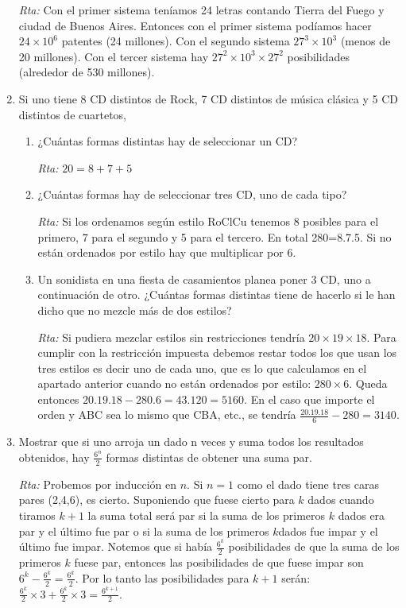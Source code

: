\documentclass[a4paper,12pt,twoside,spanish,reqno]{amsbook}
\numberwithin{equation}{section}
\begin{document}
\begin{enumerate}
\noindent\textit{Rta:} Con el primer sistema teníamos 24 letras contando Tierra del Fuego y ciudad de Buenos Aires. Entonces con el primer sistema podíamos hacer $24\times 10^6$ patentes (24 millones). Con el segundo sistema  $27^3\times 10^3$ (menos de 20 millones). Con el tercer sistema hay $27^2\times 10^3 \times 27^2$ posibilidades (alrededor de 530 millones).

\medskip

\item Si uno tiene 8 CD distintos de Rock, 7 CD distintos de música clásica y 5 CD
distintos de cuartetos,

\begin{enumerate}
\item 
¿Cuántas formas distintas hay de seleccionar un CD?

\noindent\textit{Rta:}  $20= 8+7+5$

\item ¿Cuántas formas hay de seleccionar tres CD, uno de cada tipo?

\noindent\textit{Rta:} Si los ordenamos según estilo RoClCu tenemos 8 posibles para el primero, 7 para el segundo y 5 para el tercero. En total 280=8.7.5. Si no están ordenados por estilo hay que multiplicar por 6.

\item Un sonidista en una fiesta de casamientos planea poner 3 CD, uno a continuación
de otro. ¿Cuántas formas distintas tiene de hacerlo si le han dicho que no
mezcle más de dos estilos?

\noindent\textit{Rta:} Si pudiera mezclar estilos  sin restricciones tendría  $20\times 19\times 18$. Para cumplir con la restricción impuesta debemos restar todos los que usan los tres estilos es decir uno de cada uno, que es lo que calculamos en el  apartado anterior cuando no están ordenados por estilo: $280\times 6$. Queda entonces $20.19.18-280.6=43.120=5160$. En el caso que importe el orden y ABC sea lo mismo que CBA, etc., se tendría $\frac{20.19.18}{6}-280=3140$.
\end{enumerate}

\medskip

\item Mostrar que si uno arroja un dado n veces y suma todos los resultados obtenidos,
hay $\frac{6^n}{2}$
formas distintas de obtener una suma par.

\noindent\textit{Rta:} Probemos por inducción en $n$. Si $n=1$ como el dado tiene tres caras pares (2,4,6), es cierto.
Suponiendo que fuese cierto para $k$ dados cuando tiramos $k+1$ la suma total será par si la suma de los primeros $k$ dados era par y el último fue par o si la suma de los primeros $k$dados fue impar y el último fue impar. Notemos que si había $\frac{6^k}{2}$ posibilidades de que la suma de los primeros $k$ fuese par, entonces las posibilidades de que fuese impar son $6^k-\frac{6^k}{2}=\frac{6^k}{2}$. Por lo tanto las posibilidades para $k+1$ serán:${ \frac{6^k}{2}\times 3+\frac{6^k}{2}\times 3=\frac{6^{k+1}}{2}}$.


\end{enumerate}
\end{document}
